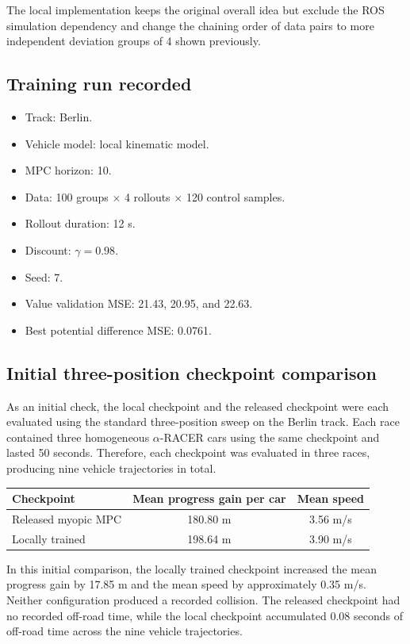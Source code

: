 \documentclass[11pt]{article}
\begin{document}
The local implementation keeps the original overall idea but exclude the ROS simulation dependency and change the chaining order of data pairs to more independent deviation groups of 4 shown previously.

\subsection{Training run recorded}

\begin{itemize}
  \item Track: Berlin.
  \item Vehicle model: local kinematic model.
  \item MPC horizon: 10.
  \item Data: 100 groups $\times$ 4 rollouts $\times$ 120 control samples.
  \item Rollout duration: 12 s.
  \item Discount: $\gamma=0.98$.
  \item Seed: 7.
  \item Value validation MSE: 21.43, 20.95, and 22.63.
  \item Best potential difference MSE: 0.0761.
\end{itemize}

\subsection{Initial three-position checkpoint comparison}

As an initial check, the local checkpoint and the released checkpoint
were each evaluated using the standard three-position sweep on the Berlin track.
Each race contained three homogeneous $\alpha$-RACER cars using the same
checkpoint and lasted 50 seconds. Therefore, each checkpoint was evaluated in
three races, producing nine vehicle trajectories in total.

\begin{center}
\small
\begin{tabular}{lcc}
\toprule
Checkpoint & Mean progress gain per car & Mean speed \\
\midrule
Released myopic MPC & 180.80 m & 3.56 m/s \\
Locally trained & 198.64 m & 3.90 m/s \\
\bottomrule
\end{tabular} 
\end{center}

In this initial comparison, the locally trained checkpoint increased the mean
progress gain by 17.85 m and the mean speed by approximately 0.35 m/s. Neither
configuration produced a recorded collision. The released checkpoint had no
recorded off-road time, while the local checkpoint accumulated 0.08 seconds of off-road time across the nine vehicle trajectories.
\end{document}
